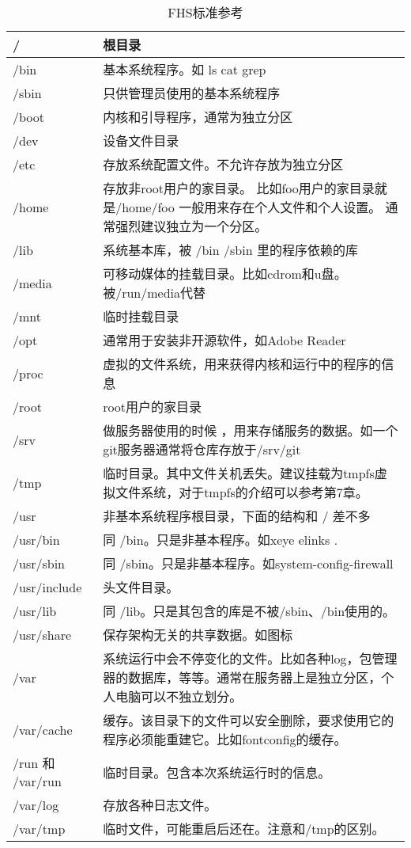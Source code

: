 \documentclass[amstex,twoside]{ctexbook}
\begin{document}
\begin{longtable}{|l|p{}|}
\caption{FHS标准参考}\\
\hline
/ & 根目录 \\\hline
/bin & 基本系统程序。如 ls cat grep \\\hline
/sbin & 只供管理员使用的基本系统程序 \\\hline
/boot & 内核和引导程序，通常为独立分区\\\hline
/dev & 设备文件目录 \\\hline
/etc & 存放系统配置文件。不允许存放为独立分区\\\hline
/home & 存放非root用户的家目录。 
比如foo用户的家目录就是/home/foo
一般用来存在个人文件和个人设置。
通常强烈建议独立为一个分区。\\\hline
/lib & 系统基本库，被 /bin /sbin 里的程序依赖的库 \\\hline
/media & 可移动媒体的挂载目录。比如cdrom和u盘。被/run/media代替\\\hline
/mnt & 临时挂载目录\\\hline
/opt & 通常用于安装非开源软件，如Adobe Reader \\\hline
/proc & 虚拟的文件系统，用来获得内核和运行中的程序的信息\\\hline
/root & root用户的家目录\\\hline
/srv & 做服务器使用的时候 ，用来存储服务的数据。如一个git服务器通常将仓库存放于/srv/git\\\hline
/tmp & 临时目录。其中文件关机丢失。建议挂载为tmpfs虚拟文件系统，对于tmpfs的介绍可以参考第7章。 \\\hline
/usr & 非基本系统程序根目录，下面的结构和 / 差不多 \\\hline
/usr/bin & 同 /bin。只是非基本程序。如xeye  elinks . \\\hline
/usr/sbin & 同 /sbin。只是非基本程序。如system-config-firewall \\\hline
/usr/include & 头文件目录。\\\hline
/usr/lib & 同 /lib。只是其包含的库是不被/sbin、/bin使用的。\\\hline
/usr/share &  保存架构无关的共享数据。如图标\\\hline
/var & 系统运行中会不停变化的文件。比如各种log，包管理器的数据库，等等。通常在服务器上是独立分区，个人电脑可以不独立划分。\\\hline
/var/cache & 缓存。该目录下的文件可以安全删除，要求使用它的程序必须能重建它。比如fontconfig的缓存。\\\hline
/run 和 /var/run & 临时目录。包含本次系统运行时的信息。\\\hline
/var/log & 存放各种日志文件。\\\hline
/var/tmp & 临时文件，可能重启后还在。注意和/tmp的区别。\\\hline
\end{longtable}
\end{document}
